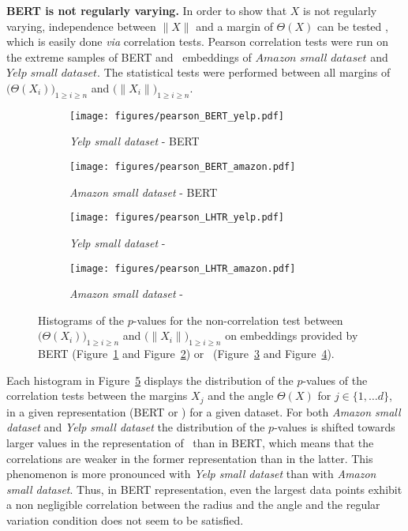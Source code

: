 \textbf{BERT is not regularly varying.}
In order to show that $X$ is not regularly varying, independence between $\|X\|$ and a margin of $\Theta(X)$ can be tested   \cite{coles1994statistical}, which is easily  done \emph{via} correlation tests.  
Pearson correlation tests were run on the extreme samples  of BERT and \HTalgo\ embeddings of $\textit{Amazon small dataset}$ and $\textit{Yelp small dataset}$. The statistical tests were performed  between all margins of $\big(\Theta(X_i)\big)_{1 \geq i \geq n}$ and $\big(\|X_i\|\big)_{1 \geq i \geq n}$.  
\begin{figure}[H]
\centering
\begin{subfigure}[t]{0.45\textwidth}
    \texttt{[image: figures/pearson\_BERT\_yelp.pdf]}
    \caption{\textit{Yelp small dataset} - BERT}
    \label{fig:pearson_bert_yelp}
\end{subfigure}
\begin{subfigure}[t]{0.45\textwidth}
    \texttt{[image: figures/pearson\_BERT\_amazon.pdf]}
    \caption{\textit{Amazon small dataset} - BERT}
    \label{fig:pearson_bert_amazon}
\end{subfigure}

\begin{subfigure}[t]{0.45\textwidth}
    \texttt{[image: figures/pearson\_LHTR\_yelp.pdf]}
    \caption{\textit{Yelp small dataset} - \HTalgo}
    \label{fig:pearson_lhtr_yelp}
\end{subfigure}
\begin{subfigure}[t]{0.45\textwidth}
    \texttt{[image: figures/pearson\_LHTR\_amazon.pdf]}
    \caption{\textit{Amazon small dataset} - \HTalgo}
    \label{fig:pearson_lhtr_amazon}
\end{subfigure}
\caption{Histograms of the $p$-values for the non-correlation test between $\big(\Theta(X_i)\big)_{1 \geq i \geq n}$ and $\big(\|X_i\|\big)_{1 \geq i \geq n}$ on embeddings provided by BERT (Figure~\ref{fig:pearson_bert_yelp} and Figure~\ref{fig:pearson_bert_amazon}) or \HTalgo\ (Figure~\ref{fig:pearson_lhtr_yelp} and Figure~\ref{fig:pearson_lhtr_amazon}).}
\label{fig:pearson}
\end{figure}
Each histogram in Figure~\ref{fig:pearson}  displays the distribution of the  $p$-values of  the correlation tests between the margins  $X_j$ and the angle $\Theta(X)$ for $j \in \{1,\ldots d\}$, in  a given representation (BERT or \HTalgo) for a given dataset. For both \textit{Amazon small dataset} and \textit{Yelp small dataset} the distribution of the $p$-values is shifted towards larger values in the representation of \HTalgo\ than in BERT, which means that the correlations are weaker in the former representation than in the latter. This phenomenon is more pronounced with \textit{Yelp small dataset} than with \textit{Amazon small dataset}. Thus, in BERT representation, even the largest data points exhibit a non negligible correlation between the radius and the angle and the regular variation condition does not seem to be satisfied. 
